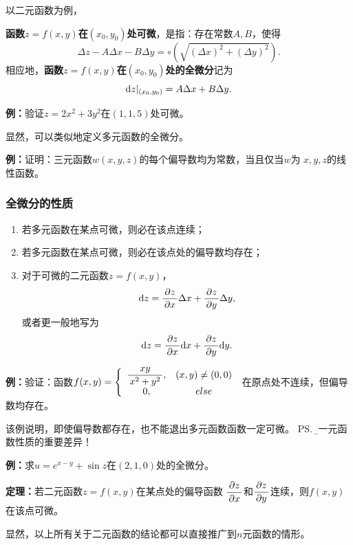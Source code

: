 以二元函数为例，
\begin{thx}
	  {\bf 函数$z=f(x,y)$在$(x_0,y_0)$处可微}，是指：存在常数$A,B$，使得
	  $$\Delta z-A\Delta x-B\Delta y=\circ(\sqrt{(\Delta x)^2+(\Delta y)^2}).$$
	  相应地，{\bf 函数$z=f(x,y)$在$(x_0,y_0)$处的全微分}记为
	  $$\mathrm{d} z|_{(x_0,y_0)}=A\Delta x+B\Delta y.$$
\end{thx}

{\bf 例：}验证$z=2x^2+3y^2$在$(1,1,5)$处可微。

显然，可以类似地定义多元函数的全微分。

{\bf 例：}证明：三元函数$w(x,y,z)$的每个偏导数均为常数，当且仅当$w$为
$x,y,z$的线性函数。

\subsubsection{全微分的性质}

\begin{thx}
	\begin{enumerate}
	  \item 若多元函数在某点可微，则必在该点连续；
	  \item 若多元函数在某点可微，则必在该点处的偏导数均存在；
	  \item 对于可微的二元函数$z=f(x,y)$，
	  $$\mathrm{d} z=\displaystyle\frac{\,{\partial z}\,}{\,{\partial x}\,}\Delta x+\displaystyle\frac{\,{\partial z}\,}{\,{\partial y}\,}\Delta y,$$
	  或者更一般地写为
	  $${\mathrm{d} z=\displaystyle\frac{\,{\partial z}\,}{\,{\partial x}\,}\mathrm{d} x+\displaystyle\frac{\,{\partial z}\,}{\,{\partial y}\,}\mathrm{d} y}.$$ 
	\end{enumerate}
\end{thx}

{\bf 例：}验证：函数$f(x,y)=\left\{\begin{array}{cc}
	\displaystyle\frac{\,{xy}\,}{\,{x^2+y^2}\,},& (x,y)\ne (0,0)\\
	0, & else
\end{array}\right.$
在原点处不连续，但偏导数均存在。

该例说明，即使偏导数都存在，也不能退出多元函数函数一定可微。
\ps{\b 与一元函数性质的重要差异！}

{\bf 例：}求$u=e^{x-y}+\sin z$在$(2,1,0)$处的全微分。

\begin{thx}
	{\bf 定理：}若二元函数$z=f(x,y)$在某点处的偏导函数
	$\displaystyle\frac{\,{\partial z}\,}{\,{\partial x}\,}$和$\displaystyle\frac{\,{\partial z}\,}{\,{\partial y}\,}$连续，则$f(x,y)$在该点可微。	
\end{thx}

显然，以上所有关于二元函数的结论都可以直接推广到$n$元函数的情形。

